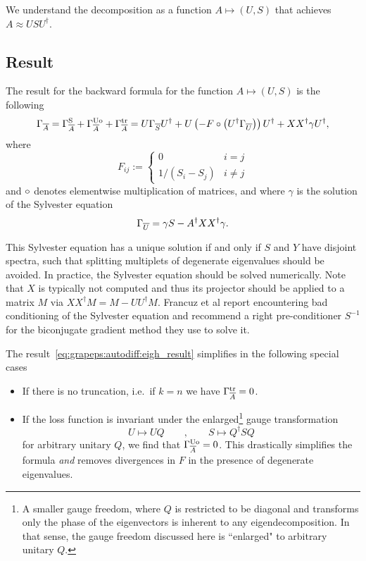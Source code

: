 We understand the decomposition as a function $A \mapsto (U, S)$ that achieves $A \approx U S U^\dagger$.

\subsection{Result}

The result for the backward formula for the function $A \mapsto (U, S)$ is the following
\begin{align}
    \label{eq:grapeps:autodiff:eigh_result}
    \Gconj{A} 
    = \GcAs + \GcAuo + \GcAtr
    = U \Gconj{S} U^\dagger
    + U \rBr{-F \hadamard \rBr{U^\dagger \Gconj{U}}} U^\dagger
    + XX^\dagger \gamma U^\dagger
    ,
\end{align}
where
\begin{equation}
    F_{ij} := \begin{cases}0 & i = j \\ 1/(S_i - S_j) & i \neq j \end{cases}
\end{equation}
and $\circ$ denotes elementwise multiplication of matrices, and where $\gamma$ is the solution of the Sylvester equation
\begin{equation}
    \Gamma_{\overline{U}} = \gamma S - A^\dagger XX^\dagger \gamma
    .
\end{equation}

This Sylvester equation has a unique solution if and only if $S$ and $Y$ have disjoint spectra, such that splitting multiplets of degenerate eigenvalues should be avoided.
%
In practice, the Sylvester equation should be solved numerically.
%
Note that $X$ is typically not computed and thus its projector should be applied to a matrix $M$ via $XX^\dagger M = M - U U^\dagger M$.
%
Francuz et al report encountering bad conditioning of the Sylvester equation and recommend a right pre-conditioner $S^{-1}$ for the biconjugate gradient method they use to solve it.


The result~\eqref{eq:grapeps:autodiff:eigh_result} simplifies in the following special cases
\begin{itemize}
    \item
    If there is no truncation, i.e.~if $k=n$ we have $\Gamma_{\overline{A}}^\mathrm{tr} = 0$.

    \item 
    If the loss function is invariant under the enlarged\footnote{
        A smaller gauge freedom, where $Q$ is restricted to be diagonal and transforms only the phase of the eigenvectors is inherent to any eigendecomposition.
        In that sense, the gauge freedom discussed here is ``enlarged" to arbitrary unitary $Q$.
    } gauge transformation
    \begin{equation}
        U \mapsto UQ \qquad , \qquad S \mapsto Q^\dagger S Q
    \end{equation}
    for arbitrary unitary $Q$, we find that $\Gamma_{\overline{A}}^\mathrm{Uo} = 0$.
    This drastically simplifies the formula \emph{and} removes divergences in $F$ in the presence of degenerate eigenvalues.
\end{itemize}




